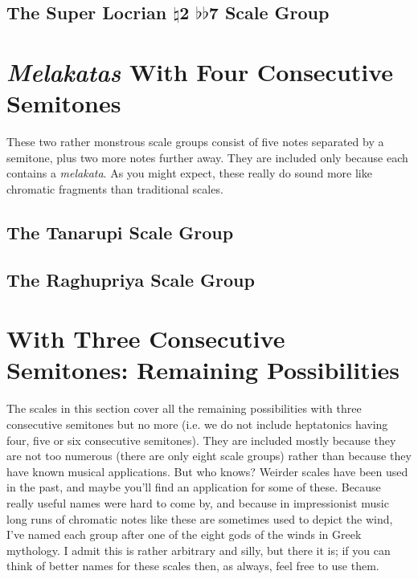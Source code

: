 \documentclass[english]{./gbook}
\begin{document}
\begin{large}
\subsection{The Super Locrian $\natural$2 $\flat\flat$7 Scale Group} %

\section{\emph{Melakatas} With Four Consecutive Semitones}

These two rather monstrous scale groups consist of five notes separated by a semitone, plus two more notes further away. They are included only because each contains a \emph{melakata}. As you might expect, these really do sound more like chromatic fragments than traditional scales.

\subsection{The Tanarupi Scale Group}

\subsection{The Raghupriya Scale Group}


\section{With Three Consecutive Semitones: Remaining Possibilities}

The scales in this section cover all the remaining possibilities with three consecutive semitones but no more (i.e. we do not include heptatonics having four, five or six consecutive semitones). They are included mostly because they are not too numerous (there are only eight scale groups) rather than because they have known musical applications. But who knows? Weirder scales have been used in the past, and maybe you'll find an application for some of these. Because really useful names were hard to come by, and because in impressionist music long runs of chromatic notes like these are sometimes used to depict the wind, I've named each group after one of the eight gods of the winds in Greek mythology. I admit this is rather arbitrary and silly, but there it is; if you can think of better names for these scales then, as always, feel free to use them.


\end{large}
\end{document}
